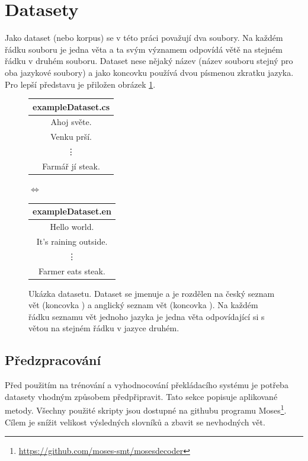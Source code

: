 \section{Datasety}\label{section:datasets}
Jako dataset (nebo korpus) se v této práci považují dva soubory. Na každém řádku souboru je jedna věta a ta svým významem odpovídá větě na stejném řádku v druhém souboru. Dataset nese nějaký název (název souboru stejný pro oba jazykové soubory) a jako koncovku používá dvou písmenou zkratku jazyka. Pro lepší představu je přiložen obrázek \ref{img:dataset}.

\begin{figure}[H]
    \begin{center}
        \begin{tabular}{|c|}
          \hline
          exampleDataset.cs\\
          \hline
          Ahoj světe. \\
          Venku prší. \\
          \vdots \\
          Farmář jí steak. \\
          \hline
        \end{tabular}
        $\Longleftrightarrow$
        \begin{tabular}{|c|}
          \hline
          exampleDataset.en\\
          \hline
          Hello world. \\
          It's raining outside. \\
          \vdots \\
          Farmer eats steak. \\
          \hline
        \end{tabular}
    \end{center}
	\caption{Ukázka datasetu. Dataset se jmenuje  a je rozdělen na český seznam vět (koncovka ) a anglický seznam vět (koncovka ). Na každém řádku seznamu vět jednoho jazyka je jedna věta odpovídající si s větou na stejném řádku v jazyce druhém.}
	\label{img:dataset}
\end{figure}

\subsection{Předzpracování} \label{subsection:preparing}
Před použitím na trénování a vyhodnocování překládacího systému je potřeba datasety vhodným způsobem předpřipravit. Tato sekce popisuje aplikované metody. Všechny použité skripty jsou dostupné na githubu programu Moses\footnote{\url{https://github.com/moses-smt/mosesdecoder}}. Cílem je snížit velikost výsledných slovníků a zbavit se nevhodných vět.

